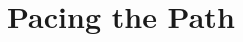 \documentclass[12pt, leqno]{article} %
\begin{document}



\section*{Pacing the Path}
\end{document}
